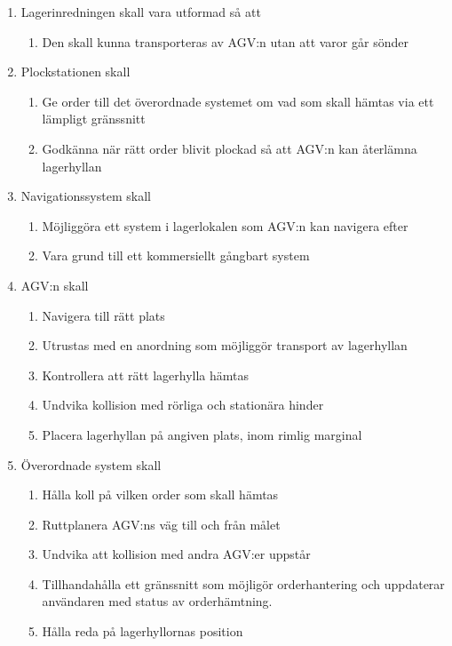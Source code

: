 \documentclass[a4paper,11pt]{article}
\begin{document}
\newpage
\begin{enumerate}
  \item Lagerinredningen skall vara utformad så att
  \begin{enumerate}
    \item Den skall kunna transporteras av AGV:n utan att varor går sönder
  \end{enumerate}

  \item Plockstationen skall
  \begin{enumerate}
    \item Ge order till det överordnade systemet om vad som skall hämtas
		via ett lämpligt gränssnitt
    \item Godkänna när rätt order blivit plockad så att AGV:n kan återlämna lagerhyllan
  \end{enumerate}

  \item Navigationssystem skall
  \begin{enumerate}
    \item Möjliggöra ett system i lagerlokalen som AGV:n kan navigera efter
	\item Vara grund till ett kommersiellt gångbart system
  \end{enumerate}

  \item AGV:n skall
  \begin{enumerate}
    \item Navigera till rätt plats
    \item Utrustas med en anordning som möjliggör transport av lagerhyllan
    \item Kontrollera att rätt lagerhylla hämtas
    \item Undvika kollision med rörliga och stationära hinder
    \item Placera lagerhyllan på angiven plats, inom rimlig marginal
  \end{enumerate}

  \item Överordnade system skall
  \begin{enumerate}
    \item Hålla koll på vilken order som skall hämtas
    \item Ruttplanera AGV:ns väg till och från målet
    \item Undvika att kollision med andra AGV:er uppstår
	\item Tillhandahålla ett gränssnitt som möjligör orderhantering och
		uppdaterar användaren med status av orderhämtning.
    \item Hålla reda på lagerhyllornas position
  \end{enumerate}
\end{enumerate}
\end{document}
